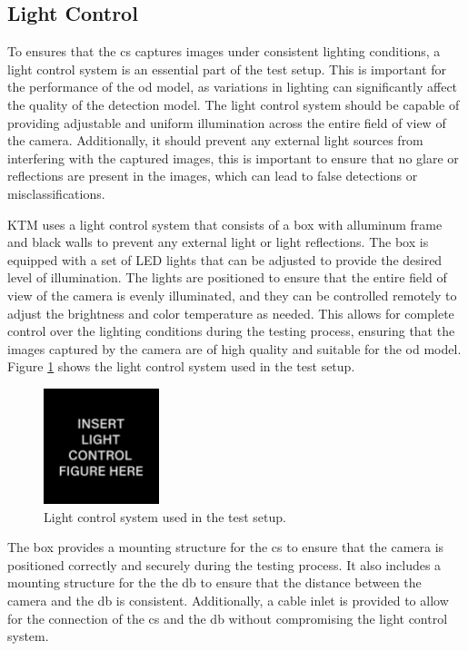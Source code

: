 \subsection{Light Control}
To ensures that the \gls{cs} captures images under consistent lighting conditions, a light control system is an essential part of the test setup. This is important for the performance of the \gls{od} model, as variations in lighting can significantly affect the quality of the detection model. The light control system should be capable of providing adjustable and uniform illumination across the entire field of view of the camera. Additionally, it should prevent any external light sources from interfering with the captured images, this is important to ensure that no glare or reflections are present in the images, which can lead to false detections or misclassifications.

KTM uses a light control system that consists of a box with alluminum frame and black walls to prevent any external light or light reflections. The box is equipped with a set of LED lights that can be adjusted to provide the desired level of illumination. The lights are positioned to ensure that the entire field of view of the camera is evenly illuminated, and they can be controlled remotely to adjust the brightness and color temperature as needed. This allows for complete control over the lighting conditions during the testing process, ensuring that the images captured by the camera are of high quality and suitable for the \gls{od} model. Figure \ref{LightControl} shows the light control system used in the test setup.

\begin{figure}[!htb]
    \centering
    \includegraphics[width=0.3\textwidth]{Figures/Light_control.png}
    \caption{Light control system used in the test setup.}
    \label{LightControl}
\end{figure}

The box provides a mounting structure for the \gls{cs} to ensure that the camera is positioned correctly and securely during the testing process. It also includes a mounting structure for the the \gls{db} to ensure that the distance between the camera and the \gls{db} is consistent. Additionally, a cable inlet is provided to allow for the connection of the \gls{cs} and the \gls{db} without compromising the light control system.


